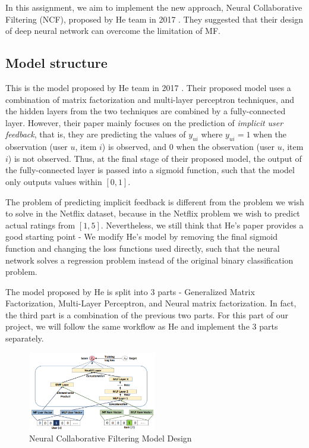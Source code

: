 \documentclass[final]{cvpr}
\begin{document}
In this assignment, we aim to implement the new approach, Neural Collaborative Filtering (NCF), proposed by He team in 2017 \cite{he2017neural}. They suggested that their design of deep neural network can overcome the limitation of MF.

\subsection{Model structure}

This is the model proposed by He team in 2017 \cite{he2017neural}. Their proposed model uses a combination of matrix factorization and multi-layer perceptron techniques, and the hidden layers from the two techniques are combined by a fully-connected layer. However, their paper mainly focuses on the prediction of \textit{implicit user feedback}, that is, they are predicting the values of $y_{ui}$ where $y_{ui}=1$ when the observation (user $u$, item $i$) is observed, and $0$ when the
observation (user $u$, item $i$) is not observed. Thus, at the final stage of their proposed model, the output of the fully-connected layer is passed into a sigmoid function, such that the model only outputs values within $[0, 1]$. 

The problem of predicting implicit feedback is different from the problem we wish to solve in the Netflix dataset, because in the Netflix problem we wish to predict actual ratings from $[1, 5]$.
Nevertheless, we still think that He's paper provides a good starting point - We modify He's model by removing the final sigmoid function and changing the loss functions used directly, such that the neural network solves a regression problem instead of the original binary
classification problem.

The model proposed by He is split into 3 parts - Generalized Matrix Factorization, Multi-Layer Perceptron, and Neural matrix factorization. In fact, the third part is a combination of the previous two parts. For this part of our project, we will follow the same workflow as He and implement the 3 parts separately. 

\begin{figure}[h]
	\includegraphics[width=0.5\textwidth]{./NeuCF.PNG}
	\caption{Neural Collaborative Filtering Model Design \cite{he2017neural}}
\end{figure}
\end{document}
